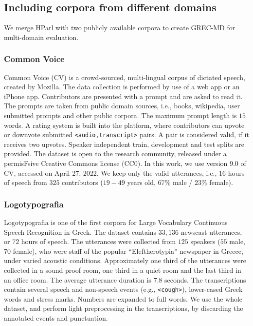 \documentclass[journal]{IEEEtran}
\begin{document}
\subsection{Including corpora from different domains}

We merge HParl with two publicly available corpora to create GREC-MD for multi-domain evaluation.

\subsubsection{Common Voice} Common Voice (CV) \cite{ardila2020common} is a crowd-sourced, multi-lingual corpus of dictated speech, created by Mozilla. The data collection is performed by use of a web app or an iPhone app. Contributors are presented with a prompt and are asked to read it. The prompts are taken from public domain sources, i.e., books, wikipedia, user submitted prompts and other public corpora. The maximum prompt length is $15$ words. A rating system is built into the platform, where contributors can upvote or downvote submitted \texttt{<audio,transcript>} pairs. A pair is considered valid, if it receives two upvotes. Speaker independent train, development and test splits are provided.
The dataset is open to the research community, released under a permisFsive Creative Commons license (CC0).
In this work, we use version 9.0 of CV, accessed on April 27, 2022. We keep only the valid utterances, i.e., $16$ hours of speech from $325$ contributors ($19-49$ years old, $67\%$ male / $23\%$ female).

\subsubsection{Logotypografia} Logotypografia \cite{digalakis03_eurospeech} is one of the first corpora for Large Vocabulary Continuous Speech Recognition in Greek. The dataset contains $33,136$ newscast utterances, or $72$ hours of speech. The utterances were collected from $125$ speakers ($55$ male, $70$ female), who were staff of the popular ``Eleftherotypia'' newspaper in Greece, under varied acoustic conditions. Approximately one third of the utterances were collected in a sound proof room, one third in a quiet room and the last third in an office room. The average utterance duration is $7.8$ seconds. The transcriptions contain several speech and non-speech events (e.g., \texttt{<cough>}), lower-cased Greek words and stress marks. Numbers are expanded to full words. We use the whole dataset, and perform light preprocessing in the transcriptions, by discarding the annotated events and punctuation.
\end{document}

